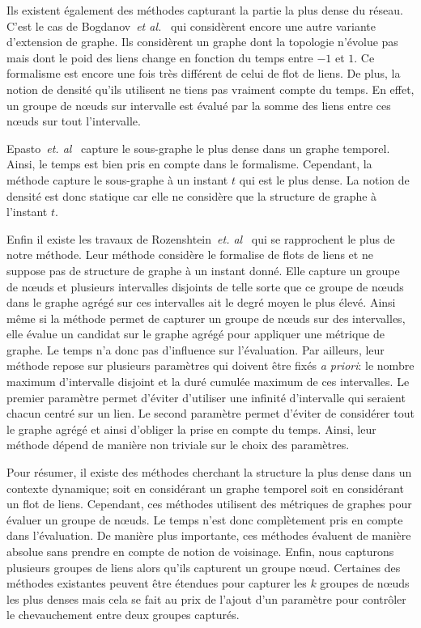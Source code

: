 Ils existent également des méthodes capturant la partie la plus dense du réseau.
C'est le cas de Bogdanov~\emph{et al.}~\cite{Bogdanov2011} qui considèrent encore une autre variante d'extension de graphe.
Ils considèrent un graphe dont la topologie n'évolue pas mais dont le poid des liens change en fonction du temps entre $-1$ et $1$.
Ce formalisme est encore une fois très différent de celui de flot de liens.
De plus, la notion de densité qu'ils utilisent ne tiens pas vraiment compte du temps.
En effet, un groupe de n\oe uds sur intervalle est évalué par la somme des liens entre ces n\oe uds sur tout l'intervalle.


Epasto~\emph{et. al}~\cite{Epasto2015} capture le sous-graphe le plus dense dans un graphe temporel.
Ainsi, le temps est bien pris en compte dans le formalisme.
Cependant, la méthode capture le sous-graphe à un instant $t$ qui est le plus dense.
La notion de densité est donc statique car elle ne considère que la structure de graphe à l'instant $t$.


Enfin il existe les travaux de Rozenshtein~\emph{et. al}~\cite{rozenshtein2014} qui se rapprochent le plus de notre méthode.
Leur méthode considère le formalise de flots de liens et ne suppose pas de structure de graphe à un instant donné.
Elle capture un groupe de n\oe uds et plusieurs intervalles disjoints de telle sorte que ce groupe de n\oe uds dans le graphe agrégé sur ces intervalles ait le degré moyen le plus élevé.
Ainsi même si la méthode permet de capturer un groupe de n\oe uds sur des intervalles, elle évalue un candidat sur le graphe agrégé pour appliquer une métrique de graphe.
Le temps n'a donc pas d'influence sur l'évaluation.
Par ailleurs, leur méthode repose sur plusieurs paramètres qui doivent être fixés \emph{a priori}: le nombre maximum d'intervalle disjoint et la duré cumulée maximum de ces intervalles.
Le premier paramètre permet d'éviter d'utiliser une infinité d'intervalle qui seraient chacun centré sur un lien.
Le second paramètre permet d'éviter de considérer tout le graphe agrégé et ainsi d'obliger la prise en compte du temps.
Ainsi, leur méthode dépend de manière non triviale sur le choix des paramètres.

\bigskip

Pour résumer, il existe des méthodes cherchant la structure la plus dense dans un contexte dynamique; soit en considérant un graphe temporel soit en considérant un flot de liens.
Cependant, ces méthodes utilisent des métriques de graphes pour évaluer un groupe de n\oe uds.
Le temps n'est donc complètement pris en compte dans l'évaluation.
De manière plus importante, ces méthodes évaluent de manière absolue sans prendre en compte de notion de voisinage.
Enfin, nous capturons plusieurs groupes de liens alors qu'ils capturent un groupe n\oe ud.
Certaines des méthodes existantes peuvent être étendues pour capturer les $k$ groupes de n\oe uds les plus denses mais cela se fait au prix de l'ajout d'un paramètre pour contrôler le chevauchement entre deux groupes capturés.


